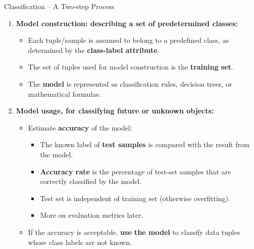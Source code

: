 \begin{frame}{Classification -- A Two-step Process}
	\begin{enumerate}
		\item \textbf{Model construction: describing a set of predetermined classes:}
		      \begin{itemize}
			      \item Each tuple/sample is assumed to belong to a predefined class, as determined by the \textbf{\color{airforceblue}class-label attribute}.
			      \item The set of tuples used for model construction is the \textbf{\color{airforceblue}training set}.
			      \item The \textbf{\color{airforceblue}model} is represented as classification rules, decision trees, or mathematical formulae.
		      \end{itemize}
		\item \textbf{Model usage, for classifying future or unknown objects:}
		      \begin{itemize}
			      \item Estimate \textbf{\color{airforceblue}accuracy} of the model:
			            \begin{itemize}
				            \item The known label of \textbf{test samples} is compared with the result from the model.
				            \item \textbf{Accuracy rate} is the percentage of test-set samples that are correctly classified by the model.
				            \item Test set is independent of training set (otherwise overfitting).
				            \item More on evaluation metrics later.
			            \end{itemize}
			      \item If the accuracy is acceptable, \textbf{\color{airforceblue}use the model} to classify data tuples whose class labels are not known.
		      \end{itemize}
	\end{enumerate}
\end{frame}


